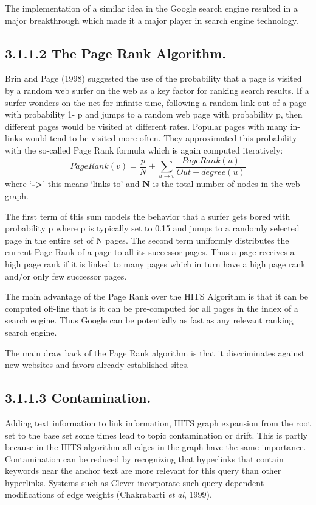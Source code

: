 \documentclass{article}
\begin{document}
The implementation of a similar idea in the Google search engine resulted in a major breakthrough which made it a major player in search engine technology.


\subsection*{3.1.1.2 The Page Rank Algorithm.}
 Brin and Page (1998) suggested the use of the probability that a page is visited by a random web surfer on the web as a key factor for ranking search results. If a surfer wonders on the net for infinite time, following a random link out of a page with probability 1- p and jumps to a random web page with probability p, then different pages would be visited at different rates. Popular pages with many in-links would tend to be visited more often. They approximated this probability with the so-called Page Rank formula which is again computed iteratively:
\begin{equation} PageRank(v)= \frac{p}{N} + \sum_{u \rightarrow v} \frac{PageRank(u)}{Out-degree(u)}\end{equation}    
where ‘\textbf{->}’ this means ‘links to’ and 
 \textbf{N} is the total number of nodes in the web graph.
 
The first term of this sum models the behavior that a surfer gets bored with probability p where p is typically set to 0.15 and jumps to a randomly selected page in the entire set of N pages. The second term uniformly distributes the current Page Rank of a page to all its successor pages. Thus a page receives a high page rank if it is linked to many pages which in turn have a high page rank and/or only few successor pages.

The main advantage of the Page Rank over the HITS Algorithm is that it can be computed off-line that is it can be pre-computed for all pages in the index of a search engine. Thus Google can be potentially as fast as any relevant ranking search engine.
 
The main draw back of the Page Rank algorithm is that it discriminates against new websites and favors already established sites.
 
\subsection*{3.1.1.3 Contamination.}
Adding text information to link information, HITS graph expansion from the root set to the base set some times lead to topic contamination or drift. This is partly because in the HITS algorithm all edges in the graph have the same importance. Contamination can be reduced by recognizing that hyperlinks that contain keywords near the anchor text are more relevant for this query than other hyperlinks. Systems such as Clever incorporate such query-dependent modifications of edge weights (Chakrabarti \textit{et al}, 1999).
\end{document}
